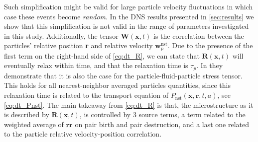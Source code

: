 Such simplification might be valid for large  particle velocity fluctuations in which case these events become \textit{random}.
In the DNS results presented in \ref{sec:results} we show that this simplification is not valid in the range of parameters investigated in this study.
Additionally, the tensor $\textbf{W}(\textbf{x},t)$ is the correlation between the particles' relative position \textbf{r} and relative velocity $\textbf{w}_p^\text{nst}$.
Due to the presence of the first term on the right-hand side of \ref{eq:dt_R}, we can state that $\textbf{R}(\textbf{x},t)$ will eventually relax within time, and that the relaxation time is $\tau_p$. 
In \citet{zhang2023evolution} they demonstrate that it is also the case for the particle-fluid-particle stress tensor.
This holds for all nearest-neighbor averaged particles quantities, since this relaxation time is related to the transport equation of $P_\text{nst}(\textbf{x},\textbf{r},t,a)$, see \ref{eq:dt_Pnst}.
The main takeaway from \ref{eq:dt_R} is that, the microstructure as it is described by $\textbf{R}(\textbf{x},t)$, is controlled by 3 source terms, a term related to the weighted average of $\textbf{rr}$ on pair birth and pair destruction, and a last one related to the particle relative velocity-position correlation. 


